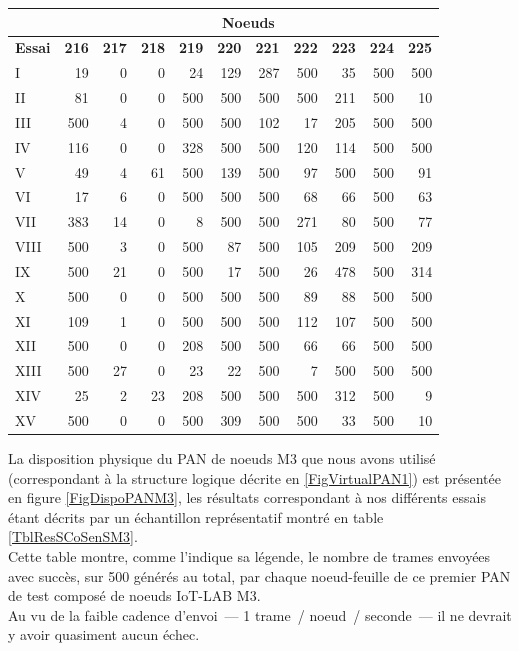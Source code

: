 \begin{itemize}
\begin{itemize}
\begin{table}[!p]
\centering

\begin{tabular}{|l|r|r|r|r|r|r|r|r|r|r|}
\hline
 & \multicolumn{10}{c|}{\textbf{Noeuds}} \\
\hline
 \textbf{Essai} & \textbf{216} & \textbf{217} & \textbf{218} & \textbf{219}
                & \textbf{220} & \textbf{221} & \textbf{222} & \textbf{223}
                & \textbf{224} & \textbf{225} \\
\hline
 I    &  19 &   0 &   0 &  24 & 129 & 287 & 500 &  35 & 500 & 500 \\
 II   &  81 &   0 &   0 & 500 & 500 & 500 & 500 & 211 & 500 &  10 \\
 III  & 500 &   4 &   0 & 500 & 500 & 102 &  17 & 205 & 500 & 500 \\
 IV   & 116 &   0 &   0 & 328 & 500 & 500 & 120 & 114 & 500 & 500 \\
 V    &  49 &   4 &  61 & 500 & 139 & 500 &  97 & 500 & 500 &  91 \\
 VI   &  17 &   6 &   0 & 500 & 500 & 500 &  68 &  66 & 500 &  63 \\
 VII  & 383 &  14 &   0 &   8 & 500 & 500 & 271 &  80 & 500 &  77 \\
 VIII & 500 &   3 &   0 & 500 &  87 & 500 & 105 & 209 & 500 & 209 \\
 IX   & 500 &  21 &   0 & 500 &  17 & 500 &  26 & 478 & 500 & 314 \\
 X    & 500 &   0 &   0 & 500 & 500 & 500 &  89 &  88 & 500 & 500 \\
 XI   & 109 &   1 &   0 & 500 & 500 & 500 & 112 & 107 & 500 & 500 \\
 XII  & 500 &   0 &   0 & 208 & 500 & 500 &  66 &  66 & 500 & 500 \\
 XIII & 500 &  27 &   0 &  23 &  22 & 500 &   7 & 500 & 500 & 500 \\
 XIV  &  25 &   2 &  23 & 208 & 500 & 500 & 500 & 312 & 500 &   9 \\
 XV   & 500 &   0 &   0 & 500 & 309 & 500 & 500 &  33 & 500 &  10 \\
\hline
\end{tabular}

\label{TblResSCoSenSM3}
\end{table}


  La disposition physique du PAN de noeuds M3 que nous avons utilisé
  (correspondant à la structure logique décrite en \vref{FigVirtualPAN1})
  est présentée en figure \vref{FigDispoPANM3}, les résultats correspondant
  à nos différents essais étant décrits par un échantillon représentatif
  montré en table \vref{TblResSCoSenSM3}.\\
  Cette table montre, comme l'indique sa légende, le nombre de trames
  envoyées avec succès, sur 500 générés au total, par chaque noeud-feuille
  de ce premier PAN de test composé de noeuds IoT-LAB M3.\\
  Au vu de la faible cadence d'envoi~--- 1 trame~/ noeud~/ seconde~---
  il ne devrait y avoir quasiment aucun échec.


\end{itemize}
\end{itemize}
